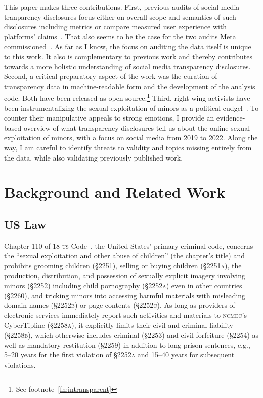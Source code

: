 \documentclass[nonacm,screen]{acmart}
\newcommand\V[1]{\textsc{\MakeLowercase{#1}}}
\begin{document}
This paper makes three contributions. First, previous audits of social media
tranparency disclosures focus either on overall scope and semantics of such
disclosures including metrics or compare measured user experience with
platforms' claims~\cite{AccessNow2021,CrockerGebhartea2019,Francoisdouek2021,
StoughtonRosenzweig2022,WagnerRozgonyiea2020}. That also seems to be the case
for the two audits Meta commissioned~\cite{BradfordGriselea2019,Meta2022,
Plumb2019,Sarang2022}. As far as I know, the focus on auditing the data itself
is unique to this work. It also is complementary to previous work and thereby
contributes towards a more holistic understanding of social media transparency
disclosures. Second, a critical preparatory aspect of the work was the curation
of transparency data in machine-readable form and the development of the
analysis code. Both have been released as open source.\footnote{See
footnote~\ref{fn:intransparent}} Third, right-wing activists have been
instrumentalizing the sexual exploitation of minors as a political
cudgel~\cite{BuntainBarlowea2022,Feffer2021,Gilbert2023, Romano2022}. To counter
their manipulative appeals to strong emotions, I provide an evidence-based
overview of what transparency disclosures tell us about the online sexual
exploitation of minors, with a focus on social media from 2019 to 2022. Along
the way, I am careful to identify threats to validity and topics missing
entirely from the data, while also validating previously published work.



\section{Background and Related Work}
\label{sec:background}

\subsection{US Law}

Chapter 110 of 18 \V{US} Code~\cite{Chapter110Code18US}, the United States'
primary criminal code, concerns the ``sexual exploitation and other abuse of
children'' (the chapter's title) and prohibits grooming children (\S2251),
selling or buying children (\V{\S2251A}), the production, distribution, and
possession of sexually explicit imagery involving minors (\S2252) including
child pornography (\V{\S2252A}) even in other countries (\S2260), and tricking
minors into accessing harmful materials with misleading domain names
(\V{\S2252B}) or page contents (\V{\S2252C}). As long as providers of electronic
services immediately report such activities and materials to \V{NCMEC}'s
CyberTipline (\V{\S2258A}), it explicitly limits their civil and criminal
liability (\V{\S2258B}), which otherwise includes criminal (\S2253) and civil
forfeiture (\S2254) as well as mandatory restitution (\S2259) in addition to
long prison sentences, e.g., 5--20 years for the first violation of \V{\S2252A}
and 15--40 years for subsequent violations.
\end{document}
